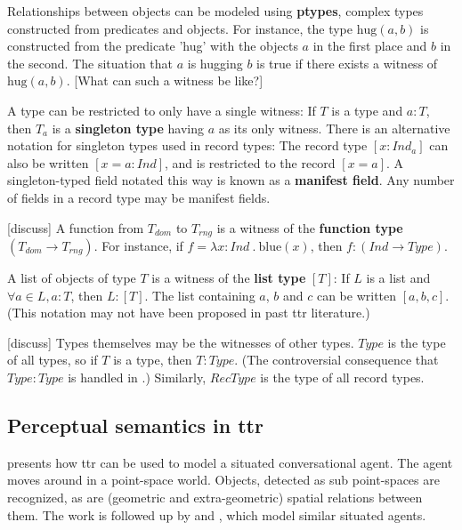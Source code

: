 Relationships between objects can be modeled using \textbf{ptypes}, complex types constructed from predicates and objects.
For instance, the type $\text{hug}(a,b)$ is constructed from the predicate 'hug' with the objects $a$ in the first place and $b$ in the second.
The situation that $a$ is hugging $b$ is true if there exists a witness of $\text{hug}(a,b)$.
[What can such a witness be like?]

A type can be restricted to only have a single witness:
If $T$ is a type and $a:T$, then $T_a$ is a \textbf{singleton type} having $a$ as its only witness.
There is an alternative notation for singleton types used in record types:
The record type $[x:Ind_a]$ can also be written $[x=a:Ind]$, and is restricted to the record $[x=a]$.
A singleton-typed field notated this way is known as a \textbf{manifest field}.
Any number of fields in a record type may be manifest fields.

[discuss] A function from $T_{dom}$ to $T_{rng}$ is a witness of the \textbf{function type} $(T_{dom} \rightarrow T_{rng})$.
For instance, if $f = \lambda x : Ind\ .\ \text{blue}(x)$, then $f : (Ind \rightarrow Type)$.

A list of objects of type $T$ is a witness of the \textbf{list type} $[T]$:
If $L$ is a list and $\forall a \in L, a : T$, then $L : [T]$.
The list containing $a$, $b$ and $c$ can be written $[a, b, c]$.
(This notation may not have been proposed in past \gls{ttr} literature.)

[discuss] Types themselves may be the witnesses of other types.
$Type$ is the type of all types, so if $T$ is a type, then $T : Type$.
(The controversial consequence that $Type : Type$ is handled in \citet[section 2.7]{CooperTypetheorysemantics2012}.)
Similarly, $RecType$ is the type of all record types.



\subsection{Perceptual semantics in \acrfull{ttr}}

\cite{DobnikModellinglanguageaction2012} presents how \gls{ttr} can be used to model a situated conversational agent.
The agent moves around in a point-space world.
Objects, detected as sub point-spaces are recognized, as are (geometric and extra-geometric) spatial relations between them.
The work is followed up by \cite{ttrspat} and \cite{lspc}, which model similar situated agents.

